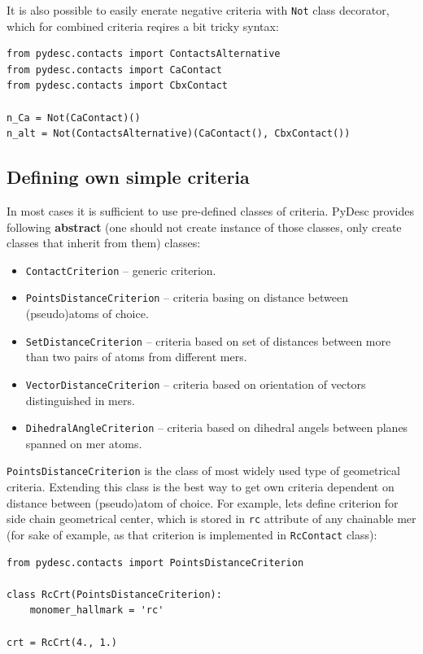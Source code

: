 \documentclass{article}
\begin{document}
It is also possible to easily enerate negative criteria with \texttt{Not} class decorator, which for combined criteria reqires a bit tricky syntax:

\begin{lstlisting}
from pydesc.contacts import ContactsAlternative
from pydesc.contacts import CaContact
from pydesc.contacts import CbxContact

n_Ca = Not(CaContact)()
n_alt = Not(ContactsAlternative)(CaContact(), CbxContact())
\end{lstlisting}

%
%
\subsection{Defining own simple criteria}

In most cases it is sufficient to use pre-defined classes of criteria. PyDesc provides following \textbf{abstract} (one should not create instance of those classes, only create classes that inherit from them) classes:
\begin{itemize}
    \item \texttt{ContactCriterion} -- generic criterion.
    \item \texttt{PointsDistanceCriterion} -- criteria basing on distance between (pseudo)atoms of choice.
    \item \texttt{SetDistanceCriterion} -- criteria based on set of distances between more than two pairs of atoms from different mers.
    \item \texttt{VectorDistanceCriterion} -- criteria based on orientation of vectors distinguished in mers.
    \item \texttt{DihedralAngleCriterion} -- criteria based on dihedral angels between planes spanned on mer atoms.
\end{itemize}

\texttt{PointsDistanceCriterion} is the class of most widely used type of geometrical criteria. Extending this class is the best way to get own criteria dependent on distance between (pseudo)atom of choice. For example, lets define criterion for side chain geometrical center, which is stored in \texttt{rc} attribute of any chainable mer (for sake of example, as that criterion is implemented in \texttt{RcContact} class):

\begin{lstlisting}
from pydesc.contacts import PointsDistanceCriterion

class RcCrt(PointsDistanceCriterion):
    monomer_hallmark = 'rc'

crt = RcCrt(4., 1.)
\end{lstlisting}
\end{document}
